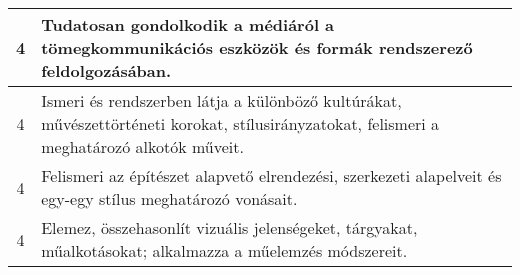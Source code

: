 \begin{longtable}{c | p{} }
                                
                                          4 &  Tudatosan gondolkodik a médiáról a tömegkommunikációs eszközök és formák rendszerező feldolgozásában. \\ \hline
                                          4 &  Ismeri és rendszerben látja a különböző kultúrákat, művészettörténeti korokat, stílusirányzatokat, felismeri a meghatározó alkotók műveit. \\ \hline
                                          4 &  Felismeri az építészet alapvető elrendezési, szerkezeti alapelveit és egy-egy stílus meghatározó vonásait. \\ \hline
                                          4 &  Elemez, összehasonlít vizuális jelenségeket, tárgyakat, műalkotásokat; alkalmazza a műelemzés módszereit. \\ \hline
                                      
                        \end{longtable}
            \clearpage

    




